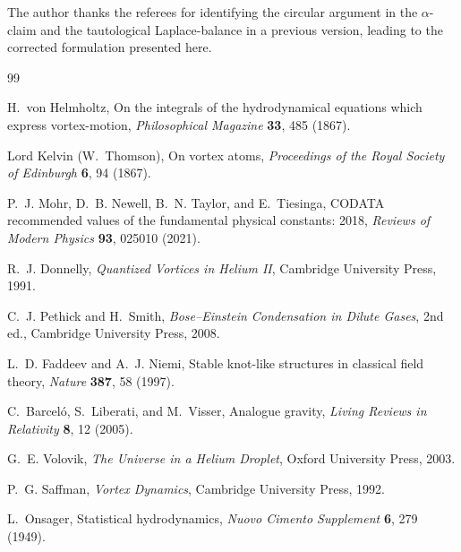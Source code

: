 \documentclass[aps,pra,preprint,longbibliography,nofootinbib]{revtex4-2}
\begin{document}
\begin{acknowledgments}
The author thanks the referees for identifying the circular
argument in the $\alpha$-claim and the tautological Laplace-balance
in a previous version, leading to the corrected formulation
presented here.
\end{acknowledgments}

\begin{thebibliography}{99}

H.~von Helmholtz,
On the integrals of the hydrodynamical equations which express
vortex-motion,
\textit{Philosophical Magazine} \textbf{33}, 485 (1867).

Lord Kelvin (W.~Thomson),
On vortex atoms,
\textit{Proceedings of the Royal Society of Edinburgh} \textbf{6},
94 (1867).

P.~J. Mohr, D.~B. Newell, B.~N. Taylor, and E.~Tiesinga,
CODATA recommended values of the fundamental physical constants: 2018,
\textit{Reviews of Modern Physics} \textbf{93}, 025010 (2021).

R.~J. Donnelly,
\textit{Quantized Vortices in Helium II},
Cambridge University Press, 1991.

C.~J. Pethick and H.~Smith,
\textit{Bose--Einstein Condensation in Dilute Gases}, 2nd ed.,
Cambridge University Press, 2008.

L.~D. Faddeev and A.~J. Niemi,
Stable knot-like structures in classical field theory,
\textit{Nature} \textbf{387}, 58 (1997).

C.~Barcel\'o, S.~Liberati, and M.~Visser,
Analogue gravity,
\textit{Living Reviews in Relativity} \textbf{8}, 12 (2005).

G.~E. Volovik,
\textit{The Universe in a Helium Droplet},
Oxford University Press, 2003.

P.~G. Saffman,
\textit{Vortex Dynamics},
Cambridge University Press, 1992.

L.~Onsager,
Statistical hydrodynamics,
\textit{Nuovo Cimento Supplement} \textbf{6}, 279 (1949).


\end{thebibliography}
\end{document}
